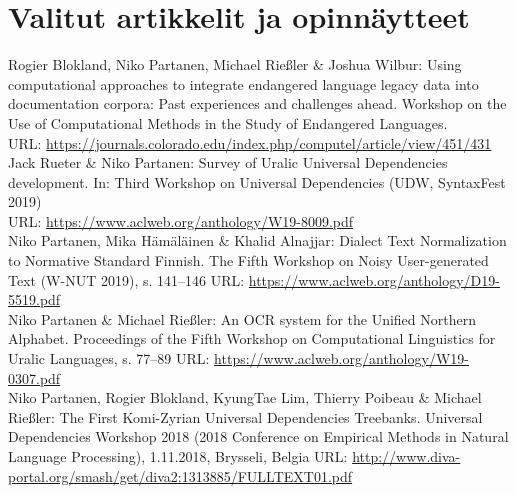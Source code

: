 \documentclass[11pt, a4paper]{article}
\newcommand{\years}[1]{\marginnote{\scriptsize #1}} %
\begin{document}
\section*{Valitut artikkelit ja opinnäytteet}


\years{2019} Rogier Blokland, Niko Partanen, Michael Rießler \& Joshua Wilbur: Using computational approaches to integrate endangered language legacy data into documentation corpora: Past experiences and challenges ahead. Workshop on the Use of Computational Methods in the Study of Endangered Languages. \\
URL: \url{https://journals.colorado.edu/index.php/computel/article/view/451/431}\\

\years{2019} Jack Rueter \& Niko Partanen: Survey of Uralic Universal Dependencies development. In: Third Workshop on Universal Dependencies (UDW, SyntaxFest 2019)
\\URL: \url{https://www.aclweb.org/anthology/W19-8009.pdf}\\

\years{2019} Niko Partanen, Mika Hämäläinen \& Khalid Alnajjar: Dialect Text Normalization to Normative Standard Finnish. The Fifth Workshop on Noisy User-generated Text (W-NUT 2019), s. 141--146
URL: \url{https://www.aclweb.org/anthology/D19-5519.pdf}\\

\years{2019} Niko Partanen \& Michael Rießler: An OCR system for the Unified Northern Alphabet. Proceedings of the Fifth Workshop on Computational Linguistics for Uralic Languages, s. 77--89 URL: \url{https://www.aclweb.org/anthology/W19-0307.pdf}\\


\years{2018} Niko Partanen, Rogier Blokland, KyungTae Lim, Thierry Poibeau \& Michael Rießler: The First Komi-Zyrian Universal Dependencies Treebanks. Universal Dependencies Workshop 2018 (2018 Conference on Empirical Methods in Natural Language Processing), 1.11.2018, Brysseli, Belgia
URL: \url{http://www.diva-portal.org/smash/get/diva2:1313885/FULLTEXT01.pdf}\\
\end{document}
